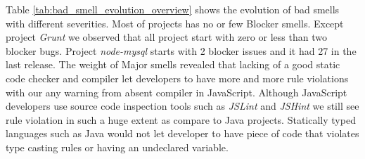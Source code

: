 Table \ref{tab:bad_smell_evolution_overview} shows the evolution of bad smells with different severities. Most of projects has no or few Blocker smells.  Except project \textit{Grunt} we observed that all project start with zero or less than two blocker bugs. Project \textit{node-mysql} starts with 2 blocker issues and it had 27 in the last release. The weight of Major smells revealed that lacking of a good static code checker and compiler let developers to have more and more rule violations with our any warning from absent compiler in JavaScript. Although JavaScript developers use source code inspection tools such as \textit{JSLint} and \textit{JSHint} we still see rule violation in such a huge extent as compare to Java projects. Statically typed languages such as Java would not let developer to have piece of code that violates type casting rules or having an undeclared variable.
	
	
	